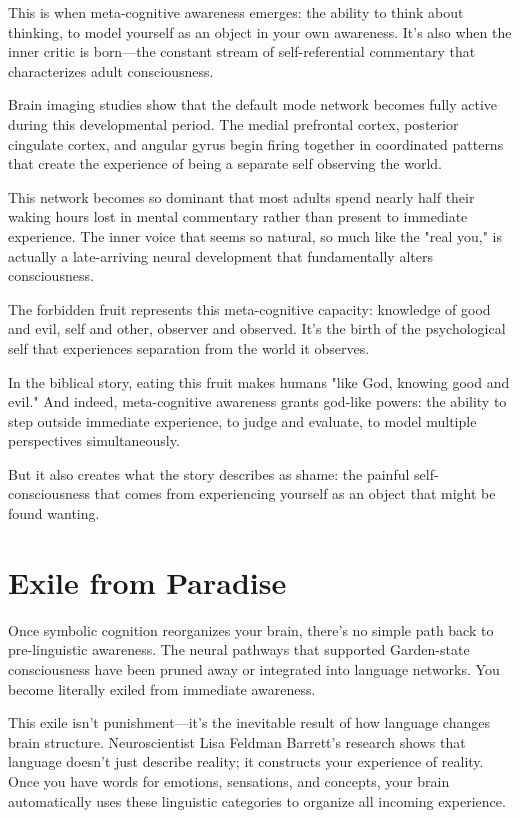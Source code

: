 \documentclass[10pt,twocolumn]{article}
\begin{document}
This is when meta-cognitive awareness emerges: the ability to think about thinking, to model yourself as an object in your own awareness. It's also when the inner critic is born—the constant stream of self-referential commentary that characterizes adult consciousness.

Brain imaging studies show that the default mode network becomes fully active during this developmental period. The medial prefrontal cortex, posterior cingulate cortex, and angular gyrus begin firing together in coordinated patterns that create the experience of being a separate self observing the world.

This network becomes so dominant that most adults spend nearly half their waking hours lost in mental commentary rather than present to immediate experience. The inner voice that seems so natural, so much like the "real you," is actually a late-arriving neural development that fundamentally alters consciousness.

The forbidden fruit represents this meta-cognitive capacity: knowledge of good and evil, self and other, observer and observed. It's the birth of the psychological self that experiences separation from the world it observes.

In the biblical story, eating this fruit makes humans "like God, knowing good and evil." And indeed, meta-cognitive awareness grants god-like powers: the ability to step outside immediate experience, to judge and evaluate, to model multiple perspectives simultaneously.

But it also creates what the story describes as shame: the painful self-consciousness that comes from experiencing yourself as an object that might be found wanting.

\section{Exile from Paradise}

Once symbolic cognition reorganizes your brain, there's no simple path back to pre-linguistic awareness. The neural pathways that supported Garden-state consciousness have been pruned away or integrated into language networks. You become literally exiled from immediate awareness.

This exile isn't punishment—it's the inevitable result of how language changes brain structure. Neuroscientist Lisa Feldman Barrett's research shows that language doesn't just describe reality; it constructs your experience of reality. Once you have words for emotions, sensations, and concepts, your brain automatically uses these linguistic categories to organize all incoming experience.
\end{document}
